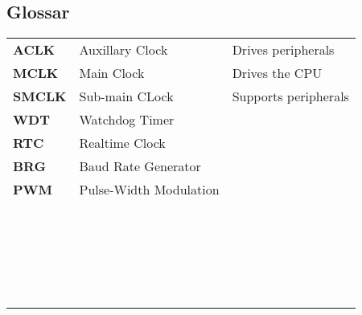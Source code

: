 \subsection*{Glossar}
\begin{tabular}{>{\bfseries}lll}
    ACLK    & Auxillary Clock   & Drives peripherals\\
    MCLK    & Main Clock        & Drives the CPU \\
    SMCLK   & Sub-main CLock    & Supports peripherals\\
    WDT     & Watchdog Timer    & \\
    RTC     & Realtime Clock    & \\
    BRG     & Baud Rate Generator& \\
    PWM     & Pulse-Width Modulation& \\
    & & \\
    & & \\
    & & \\
    & & \\
    & & \\
    & & \\
    & & \\
    & & \\
    & & \\
    & & \\
    & & \\
    & & \\
    & & \\
    & & \\
    & & \\
    & & \\
    & & \\
    & & \\
    & & \\
    & & \\
    & & \\
    & & \\
\end{tabular}